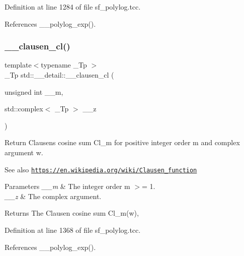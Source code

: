Definition at line 1284 of file sf\+\_\+polylog.\+tcc.



References \+\_\+\+\_\+polylog\+\_\+exp().

\mbox{\label{namespacestd_1_1____detail_ab09b3cb1a96ba96e7fddadd0ea717b1c}} 
\subsubsection{\texorpdfstring{\+\_\+\+\_\+clausen\+\_\+cl()}{\_\_clausen\_cl()}\hspace{0.1cm}{\footnotesize\ttfamily [1/2]}}
{\footnotesize\ttfamily template$<$typename \+\_\+\+Tp $>$ \\
\+\_\+\+Tp std\+::\+\_\+\+\_\+detail\+::\+\_\+\+\_\+clausen\+\_\+cl (\begin{DoxyParamCaption}\item[{unsigned int}]{\+\_\+\+\_\+m,  }\item[{std\+::complex$<$ \+\_\+\+Tp $>$}]{\+\_\+\+\_\+z }\end{DoxyParamCaption})}

Return Clausen\textquotesingle{}s cosine sum Cl\+\_\+m for positive integer order m and complex argument w. \begin{DoxySeeAlso}{See also}
\href{https://en.wikipedia.org/wiki/Clausen_function}{\tt https\+://en.\+wikipedia.\+org/wiki/\+Clausen\+\_\+function}
\end{DoxySeeAlso}

\begin{DoxyParams}{Parameters}
{\em \+\_\+\+\_\+m} & The integer order m $>$= 1. \\
\hline
{\em \+\_\+\+\_\+z} & The complex argument. \\
\hline
\end{DoxyParams}
\begin{DoxyReturn}{Returns}
The Clausen cosine sum Cl\+\_\+m(w), 
\end{DoxyReturn}


Definition at line 1368 of file sf\+\_\+polylog.\+tcc.



References \+\_\+\+\_\+polylog\+\_\+exp().

